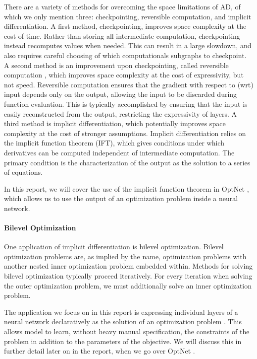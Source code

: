 \documentclass[11pt]{article}
\begin{document}
There are a variety of methods for overcoming the space limitations of AD,
of which we only mention three: checkpointing, reversible computation, and implicit differentiation.
A first method, checkpointing, improves space complexity at the cost of time.
Rather than storing all intermediate computation,
checkpointing instead recomputes values when needed.
This can result in a large slowdown,
and also requires careful choosing of which computationals subgraphs to checkpoint.
A second method is an improvement upon checkpointing, called reversible computation \citep{maclaurin2015reversible,gomez2017reversible},
which improves space complexity at the cost of expressivity, but not speed.
Reversible computation ensures that the gradient with respect to (wrt) input depends only on the output,
allowing the input to be discarded during function evaluation.
This is typically accomplished by ensuring that the input is easily reconstructed from the output,
restricting the expressivity of layers.
A third method is implicit differentiation,
which potentially improves space complexity at the cost of stronger assumptions.
Implicit differentiation relies on the implicit function theorem (IFT),
which gives conditions under which derivatives can be computed independent of
intermediate computation.
The primary condition is the characterization of the output as the solution
to a series of equations.

In this report, we will cover the use of the implicit function theorem
in OptNet \citep{optnet}, which allows us to use the output of an
optimization problem inside a neural network.

\paragraph{Bilevel Optimization}
One application of implicit differentiation is bilevel optimization.
Bilevel optimization problems are, as implied by the name,
optimization problems with another nested inner optimization problem embedded within.
Methods for solving bilevel optimization typically proceed iteratively.
For every iteration when solving the outer optimization problem,
we must additionally solve an inner optimization problem.

The application we focus on in this report is expressing individual layers of a neural network declaratively
as the solution of an optimization problem \citep{optnet,agrawal2019diffcvx,gould2019declarative}.
This allows model to learn, without heavy manual specification, the constraints of the problem
in addition to the parameters of the objective.
We will discuss this in further detail later on in the report,
when we go over OptNet \citep{optnet}.
\end{document}
